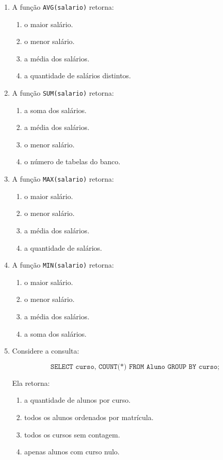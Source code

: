 \documentclass[12pt,a4paper]{article}
\begin{document}
\begin{enumerate}[label=\textbf{Q\arabic*.}]
\item A função \texttt{AVG(salario)} retorna:

\begin{enumerate}[label=\alph*)]
    \item o maior salário.
    \item o menor salário.
    \item a média dos salários.
    \item a quantidade de salários distintos.
\end{enumerate}

\item A função \texttt{SUM(salario)} retorna:

\begin{enumerate}[label=\alph*)]
    \item a soma dos salários.
    \item a média dos salários.
    \item o menor salário.
    \item o número de tabelas do banco.
\end{enumerate}

\item A função \texttt{MAX(salario)} retorna:

\begin{enumerate}[label=\alph*)]
    \item o maior salário.
    \item o menor salário.
    \item a média dos salários.
    \item a quantidade de salários.
\end{enumerate}

\item A função \texttt{MIN(salario)} retorna:

\begin{enumerate}[label=\alph*)]
    \item o maior salário.
    \item o menor salário.
    \item a média dos salários.
    \item a soma dos salários.
\end{enumerate}

\item Considere a consulta:

\[
\texttt{SELECT curso, COUNT(*) FROM Aluno GROUP BY curso;}
\]

Ela retorna:

\begin{enumerate}[label=\alph*)]
    \item a quantidade de alunos por curso.
    \item todos os alunos ordenados por matrícula.
    \item todos os cursos sem contagem.
    \item apenas alunos com curso nulo.
\end{enumerate}


\end{enumerate}
\end{document}
